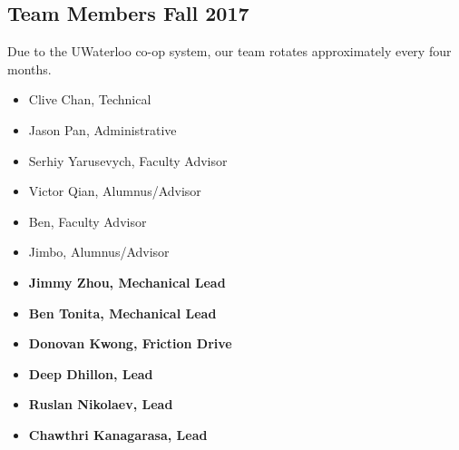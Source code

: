 \documentclass[main.tex]{subfiles}
\begin{document}
\subsection{Team Members Fall 2017}
Due to the UWaterloo co-op system, our team rotates approximately every four months.

\begin{multicols}{3}
    \begin{itemize}[label={},noitemsep]
        \item Clive Chan, Technical
        \item Jason Pan, Administrative
    \end{itemize}
    \begin{itemize}[label={},noitemsep]
        \item Serhiy Yarusevych, Faculty Advisor
        \item Victor Qian, Alumnus/Advisor
    \end{itemize}
    \begin{itemize}[label={},noitemsep]
        \item Ben, Faculty Advisor
        \item Jimbo, Alumnus/Advisor
    \end{itemize}
\end{multicols}
\begin{multicols}{3}
    \begin{itemize}[label={},noitemsep]
    \item \textbf{Jimmy Zhou, Mechanical Lead}
    \item \textbf{Ben Tonita, Mechanical Lead}
    \item \textbf{Donovan Kwong, Friction Drive}
    \end{itemize}
    \begin{itemize}[label={},noitemsep]
    \item \textbf{Deep Dhillon, Lead}
    \item \textbf{Ruslan Nikolaev, Lead}
    \end{itemize}
    \begin{itemize}[label={},noitemsep]
    \item \textbf{Chawthri Kanagarasa, Lead}
    \end{itemize}
\end{multicols}
\end{document}
